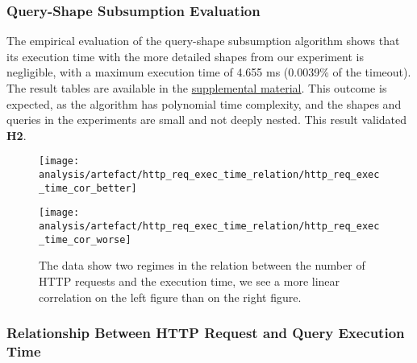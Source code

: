 \subsubsection{Query-Shape Subsumption Evaluation}
The empirical evaluation of the query-shape subsumption algorithm shows that its execution time with the more detailed shapes from our experiment is negligible, with a maximum execution time of 4.655 ms (0.0039\% of the timeout).
The result tables are available in the \hyperref[sec:supplementalMaterial]{supplemental material}.
This outcome is expected, as the algorithm has polynomial time complexity, and the shapes and queries in the experiments are small and not deeply nested.
This result validated \textbf{H2}.

\iffalse
\begin{figure}[htbp]
    \centering
    \begin{minipage}[t]{0.40\linewidth}
        \centering
        \texttt{[image: analysis/artefact/http\_req\_exec\_time\_relation/http\_req\_exec\_time\_cor\_better]}
        \label{fig:http_req_exec_time_cor_better}
    \end{minipage}
    \hspace{0.05\textwidth}
    \begin{minipage}[t]{0.40\linewidth}
        \centering
        \texttt{[image: analysis/artefact/http\_req\_exec\_time\_relation/http\_req\_exec\_time\_cor\_worse]}
        \label{fig:http_req_exec_time_cor_worse}
    \end{minipage}

    \caption{
        The data show two regimes in the relation between the number of HTTP requests and the execution time, 
        we see a more linear correlation on the left figure than on the right figure.
        }
    \label{fig:http_req_exec_time_cor}
\end{figure}

\subsubsection{Relationship Between HTTP Request and Query Execution Time}

